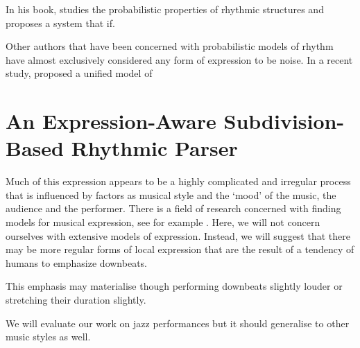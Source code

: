 In his book, \citet{temperley2007music} studies the probabilistic properties of rhythmic structures and proposes a system that if. 

Other authors that have been concerned with probabilistic models of rhythm have almost exclusively considered any form of expression to be noise. In a recent study, \citet{temperley2009unified} proposed a unified model of 

\section{An Expression-Aware Subdivision-Based Rhythmic Parser}
\label{sec:introducing}



Much of this expression appears to be a highly complicated and irregular process that is influenced by factors as musical style and the `mood' of the music, the audience and the performer. There is a field of research concerned with finding models for musical expression, see for example \citet{widmer2004computational}. Here, we will not concern ourselves with extensive models of expression. Instead, we will suggest that there may be more regular forms of local expression that are the result of a tendency of humans to emphasize downbeats.

This emphasis may materialise though performing downbeats slightly louder or stretching their duration slightly. 

We will evaluate our work on jazz performances but it should generalise to other music styles as well.